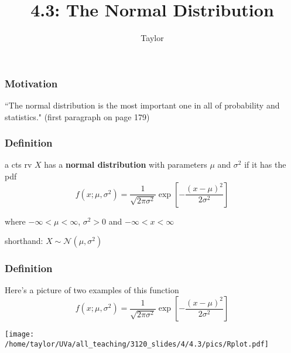 \documentclass{beamer}
\title["4.3"]{4.3: The Normal Distribution}
\author{Taylor}
\institute[UVA] 
{
University of Virginia \\
\medskip
\textit{} 
}
\date{}
\begin{document}

\begin{frame}
\titlepage 
\end{frame}

\begin{frame}
\frametitle{Motivation}

``The normal distribution is the most important one in all of probability and statistics." (first paragraph on page 179)


\end{frame}

\begin{frame}
\frametitle{Definition}

\begin{definition}
a cts rv $X$ has a \textbf{normal distribution} with parameters $\mu$ and $\sigma^2$ if it has the pdf
\[
f(x;\mu,\sigma^2) = \frac{1}{\sqrt{2 \pi \sigma^2}} \exp\left[-\frac{(x-\mu)^2}{2\sigma^2} \right] 
\]

where $-\infty < \mu < \infty$, $\sigma^2 > 0$ and $-\infty < x < \infty$
\end{definition}


shorthand: $X \sim \mathcal{N}(\mu, \sigma^2)$

\end{frame}

\begin{frame}
\frametitle{Definition}

Here's a picture of two examples of this function
\[
f(x;\mu,\sigma^2) = \frac{1}{\sqrt{2 \pi \sigma^2}} \exp\left[-\frac{(x-\mu)^2}{2\sigma^2} \right] 
\]

\begin{center}
\texttt{[image: /home/taylor/UVa/all\_teaching/3120\_slides/4/4.3/pics/Rplot.pdf]}
\end{center}

\end{frame}




% 
% 
\end{document}
